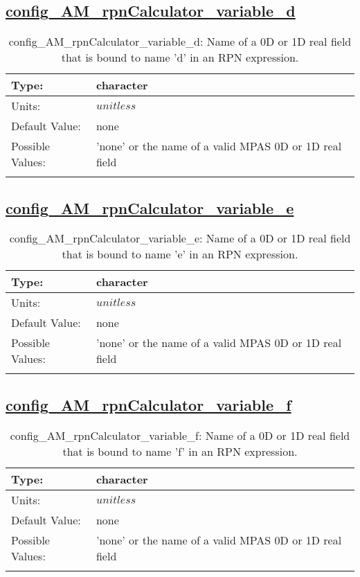 \subsection[config\_AM\_rpnCalculator\_variable\_d]{\hyperref[sec:nm_tab_AM_rpnCalculator]{config\_AM\_rpnCalculator\_variable\_d}}
\label{subsec:nm_sec_config_AM_rpnCalculator_variable_d}
\begin{center}
\begin{longtable}{| p{2.0in} || p{4.0in} |}
    \hline
    Type: & character \\
    \hline
    Units: & $unitless$ \\
    \hline
    Default Value: & none \\
    \hline
    Possible Values: & 'none' or the name of a valid MPAS 0D or 1D real field \\
    \hline
    \caption{config\_AM\_rpnCalculator\_variable\_d: Name of a 0D or 1D real field that is bound to name 'd' in an RPN expression.}
\end{longtable}
\end{center}
\subsection[config\_AM\_rpnCalculator\_variable\_e]{\hyperref[sec:nm_tab_AM_rpnCalculator]{config\_AM\_rpnCalculator\_variable\_e}}
\label{subsec:nm_sec_config_AM_rpnCalculator_variable_e}
\begin{center}
\begin{longtable}{| p{2.0in} || p{4.0in} |}
    \hline
    Type: & character \\
    \hline
    Units: & $unitless$ \\
    \hline
    Default Value: & none \\
    \hline
    Possible Values: & 'none' or the name of a valid MPAS 0D or 1D real field \\
    \hline
    \caption{config\_AM\_rpnCalculator\_variable\_e: Name of a 0D or 1D real field that is bound to name 'e' in an RPN expression.}
\end{longtable}
\end{center}
\subsection[config\_AM\_rpnCalculator\_variable\_f]{\hyperref[sec:nm_tab_AM_rpnCalculator]{config\_AM\_rpnCalculator\_variable\_f}}
\label{subsec:nm_sec_config_AM_rpnCalculator_variable_f}
\begin{center}
\begin{longtable}{| p{2.0in} || p{4.0in} |}
    \hline
    Type: & character \\
    \hline
    Units: & $unitless$ \\
    \hline
    Default Value: & none \\
    \hline
    Possible Values: & 'none' or the name of a valid MPAS 0D or 1D real field \\
    \hline
    \caption{config\_AM\_rpnCalculator\_variable\_f: Name of a 0D or 1D real field that is bound to name 'f' in an RPN expression.}
\end{longtable}
\end{center}
